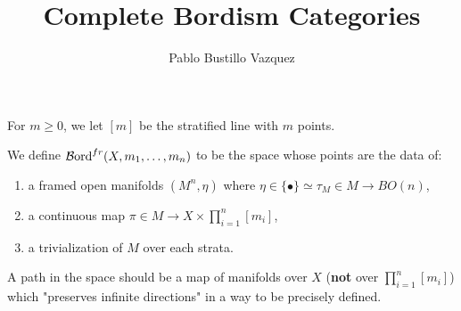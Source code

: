 \documentclass{article}
\title{Complete Bordism Categories}
\author{Pablo Bustillo Vazquez}
\begin{document}
\maketitle
\tableofcontents
\newpage

For $m \geq 0$, we let $[m]$ be the stratified line with $m$ points.

\begin{definition} We define $\operatorname{\mathcal{B}ord}^{fr}(X, m_1, \ldots, m_n)$ to be the space whose points are the data of:
    \begin{enumerate}
        \item a framed open manifolds $(M^n, \eta)$ where $\eta\in \{\bullet\} \simeq \tau_M \in M \to BO(n)$,
        \item a continuous map $\pi \in M \to X \times \prod_{i=1}^n [m_i]$,
        \item a trivialization of $M$ over each strata.
    \end{enumerate}

    A path in the space should be a map of manifolds over $X$ (\textbf{not} over $\prod_{i=1}^n [m_i]$) which "preserves infinite directions" in a way to be precisely defined.
\end{definition}
\end{document}

